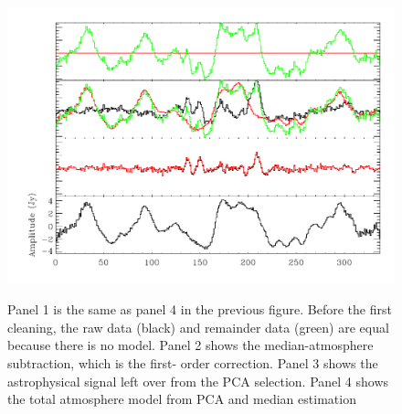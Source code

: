 \documentclass[12pt,preprint]{aastex}
\begin{document}
\begin{figure}
  \begin{minipage}{6.5in} \begin{center}
    \includegraphics[scale=0.9]{f6b}%

    \caption{Panel 1 is the same as panel 4 in the previous figure.
    Before the first cleaning, the raw data (black) and remainder data
    (green) are equal because there is no model.  Panel 2 shows the
    median-atmosphere subtraction, which is the first- order
    correction.  Panel 3 shows the astrophysical signal left over from
    the PCA selection.  Panel 4 shows the total atmosphere model from
    PCA and median estimation}

    \end{center}
    
    \label{fig:IterativeMapping-b} \end{minipage}
\end{figure}

\addtocounter{figure}{-1}
\addtocounter{subfig}{1}
\end{document}

